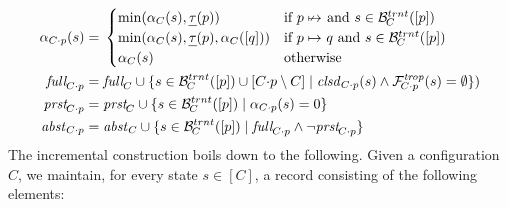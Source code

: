 \documentclass{article}
\begin{document}
\begin{align*}
\ALevel[\addp Cp](s) = {}
 & \begin{cases}
   \min(\ALevel[C](s),\pTLevel(p)) & \text{if } p\;{\nstepany} \text{ and } s\in \BackTrans[C]([p]) \\
   \min(\ALevel[C](s),\pTLevel(p),\ALevel[C]([q])) & \text{if } p\stepany q \text{ and } s\in \BackTrans[C]([p]) \\
   \ALevel[C](s) & \text{otherwise}
   \end{cases} \\
\Full[\addp Cp] = {}
  & \Full[C] \cup \gensetof{s\in \BackTrans[C]([p])\cup [\addp Cp\setminus C]}{\Closed[\addp Cp](s) \wedge \ForwTrOp[\addp Cp](s) = \emptyset}) \\
\Present[\addp Cp] = {}
  & \Present[C] \cup \gensetof{s\in \BackTrans[C]([p])}{\ALevel[\addp Cp](s) = 0} \\
\Absent[\addp Cp] = {}
  & \Absent[C] \cup \gensetof{s\in \BackTrans[C]([p])}{\Full[\addp Cp]\wedge \neg\Present[\addp Cp]}
\end{align*}
%
The incremental construction boils down to the following. Given a configuration $C$, we maintain, for every state $s\in [C]$, a record consisting of the following elements:
%
\end{document}
